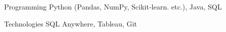 

\begin{cvskills}

  \cvskill
    {Programming} %
    {Python (Pandas, NumPy, Scikit‑learn. etc.), Java, SQL} %

  \cvskill
    {Technologies} %
    {SQL Anywhere, Tableau, Git} %
    


\end{cvskills}

